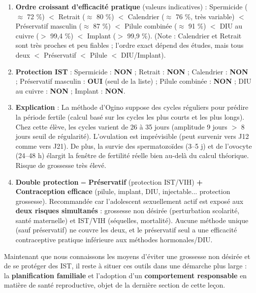 \documentclass[11pt]{article}
\begin{document}
\begin{corrige}
\begin{enumerate}
\item \textbf{Ordre croissant d'efficacité pratique} (valeurs indicatives) :
Spermicide ($\approx$ 72 \%) $<$ Retrait ($\approx$ 80 \%) $<$ Calendrier ($\approx$ 76 \%, très variable) $<$ Préservatif masculin ($\approx$ 87 \%) $<$ Pilule combinée ($\approx$ 91 \%) $<$ DIU au cuivre ($>$ 99,4 \%) $<$ Implant ($>$ 99,9 \%).
(Note : Calendrier et Retrait sont très proches et peu fiables ; l'ordre exact dépend des études, mais tous deux $<$ Préservatif $<$ Pilule $<$ DIU/Implant).
\item \textbf{Protection IST} :
Spermicide : \textbf{NON} ; Retrait : \textbf{NON} ; Calendrier : \textbf{NON} ; Préservatif masculin : \textbf{OUI} (seul de la liste) ; Pilule combinée : \textbf{NON} ; DIU au cuivre : \textbf{NON} ; Implant : \textbf{NON}.
\item \textbf{Explication} : La méthode d'Ogino suppose des cycles réguliers pour prédire la période fertile (calcul basé sur les cycles les plus courts et les plus longs). Chez cette élève, les cycles varient de 26 à 35 jours (amplitude 9 jours $>$ 8 jours seuil de régularité). L'ovulation est imprévisible (peut survenir vers J12 comme vers J21). De plus, la survie des spermatozoïdes (3--5 j) et de l'ovocyte (24--48 h) élargit la fenêtre de fertilité réelle bien au-delà du calcul théorique. Risque de grossesse très élevé.
\item \textbf{Double protection} = \textbf{Préservatif} (protection IST/VIH) \textbf{+ Contraception efficace} (pilule, implant, DIU, injectable... protection grossesse). Recommandée car l'adolescent sexuellement actif est exposé aux \textbf{deux risques simultanés} : grossesse non désirée (perturbation scolarité, santé maternelle) et IST/VIH (séquelles, mortalité). Aucune méthode unique (sauf préservatif) ne couvre les deux, et le préservatif seul a une efficacité contraceptive pratique inférieure aux méthodes hormonales/DIU.
\end{enumerate}
\end{corrige}

Maintenant que nous connaissons les moyens d'éviter une grossesse non désirée et de se protéger des IST, il reste à situer ces outils dans une démarche plus large : la \textbf{planification familiale} et l'adoption d'un \textbf{comportement responsable} en matière de santé reproductive, objet de la dernière section de cette leçon.
\end{document}
